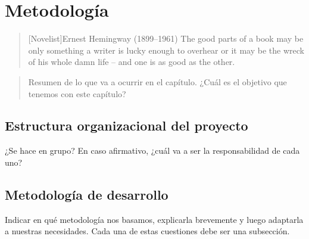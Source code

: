 \chapter{Metodología}

\begin{quotation}[Novelist]{Ernest Hemingway (1899--1961)}
The good parts of a book may be only something a writer is lucky enough to overhear or it may be the wreck of his whole damn life -- and one is as good as the other.
\end{quotation}

\begin{abstract}
Resumen de lo que va a ocurrir en el capítulo. ¿Cuál es el objetivo que tenemos con este capítulo?
\end{abstract}

\section{Estructura organizacional del proyecto}

¿Se hace en grupo? En caso afirmativo, ¿cuál va a ser la responsabilidad de cada uno?

\section{Metodología de desarrollo}

Indicar en qué metodología nos basamos, explicarla brevemente y luego adaptarla a nuestras necesidades. Cada una de estas cuestiones debe ser una subsección.